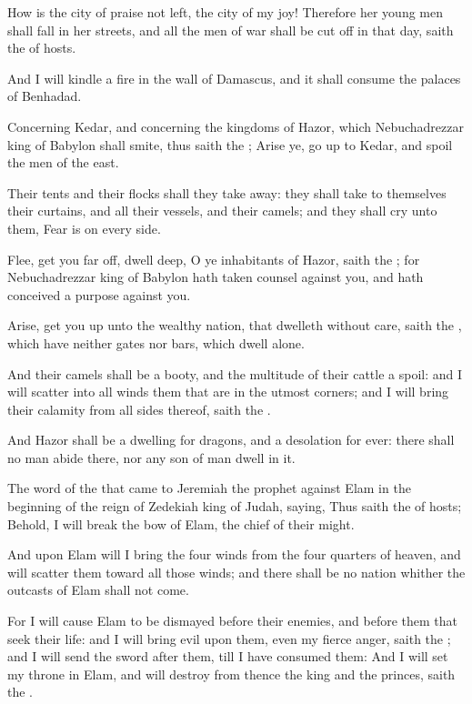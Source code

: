 \Verse How is the city of praise not left, the city of my joy!  \Verse Therefore her young men shall fall in her streets, and all the men of war shall be cut off in that day, saith the \LORD of hosts.

\Verse And I will kindle a fire in the wall of Damascus, and it shall consume the palaces of Benhadad.

\Verse Concerning Kedar, and concerning the kingdoms of Hazor, which Nebuchadrezzar king of Babylon shall smite, thus saith the \LORD; Arise ye, go up to Kedar, and spoil the men of the east.

\Verse Their tents and their flocks shall they take away: they shall take to themselves their curtains, and all their vessels, and their camels; and they shall cry unto them, Fear is on every side.

\Verse Flee, get you far off, dwell deep, O ye inhabitants of Hazor, saith the \LORD; for Nebuchadrezzar king of Babylon hath taken counsel against you, and hath conceived a purpose against you.

\Verse Arise, get you up unto the wealthy nation, that dwelleth without care, saith the \LORD, which have neither gates nor bars, which dwell alone.

\Verse And their camels shall be a booty, and the multitude of their cattle a spoil: and I will scatter into all winds them that are in the utmost corners; and I will bring their calamity from all sides thereof, saith the \LORD.

\Verse And Hazor shall be a dwelling for dragons, and a desolation for ever: there shall no man abide there, nor any son of man dwell in it.

\Verse The word of the \LORD that came to Jeremiah the prophet against Elam in the beginning of the reign of Zedekiah king of Judah, saying, \Verse Thus saith the \LORD of hosts; Behold, I will break the bow of Elam, the chief of their might.

\Verse And upon Elam will I bring the four winds from the four quarters of heaven, and will scatter them toward all those winds; and there shall be no nation whither the outcasts of Elam shall not come.

\Verse For I will cause Elam to be dismayed before their enemies, and before them that seek their life: and I will bring evil upon them, even my fierce anger, saith the \LORD; and I will send the sword after them, till I have consumed them: \Verse And I will set my throne in Elam, and will destroy from thence the king and the princes, saith the \LORD.

